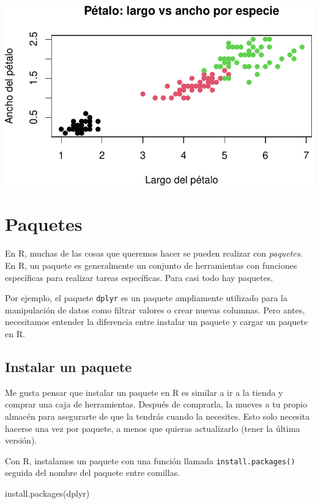 \documentclass[
  letterpaper,
  DIV=11,
  numbers=noendperiod,
  twoside]{scrreprt}
\newenvironment{Shaded}{\begin{snugshade}}{\end{snugshade}}
\newcommand{\FunctionTok}[1]{\textcolor[rgb]{0.28,0.35,0.67}{#1}}
\newcommand{\NormalTok}[1]{\textcolor[rgb]{0.00,0.23,0.31}{#1}}
\newcommand{\StringTok}[1]{\textcolor[rgb]{0.13,0.47,0.30}{#1}}
\begin{document}
\includegraphics{sesion1_files/figure-pdf/unnamed-chunk-63-1.pdf}

\chapter{Paquetes}\label{paquetes}

En R, muchas de las cosas que queremos hacer se pueden realizar con
\emph{paquetes}. En R, un paquete es generalmente un conjunto de
herramientas con funciones específicas para realizar tareas específicas.
Para casi todo hay paquetes.

Por ejemplo, el paquete \texttt{dplyr} es un paquete ampliamente
utilizado para la manipulación de datos como filtrar valores o crear
nuevas columnas. Pero antes, necesitamos entender la diferencia entre
instalar un paquete y cargar un paquete en R.

\section{Instalar un paquete}\label{instalar-un-paquete}

Me gusta pensar que instalar un paquete en R es similar a ir a la tienda
y comprar una caja de herramientas. Después de comprarla, la mueves a tu
propio almacén para asegurarte de que la tendrás cuando la necesites.
Esto solo necesita hacerse una vez por paquete, a menos que quieras
actualizarlo (tener la última versión).

Con R, instalamos un paquete con una función llamada
\texttt{install.packages()} seguida del nombre del paquete entre
comillas.

\begin{Shaded}
\begin{Highlighting}[]
\FunctionTok{install.packages}\NormalTok{(}\StringTok{\textquotesingle{}dplyr\textquotesingle{}}\NormalTok{)}
\end{Highlighting}
\end{Shaded}
\end{document}

